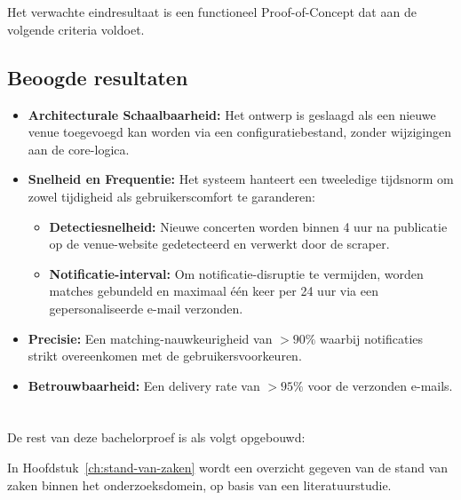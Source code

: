 \section{}%
\label{sec:onderzoeksdoelstelling}

Het verwachte eindresultaat is een functioneel Proof-of-Concept dat aan de volgende criteria voldoet.

\subsection{Beoogde resultaten}
\begin{itemize}
    \item \textbf{Architecturale Schaalbaarheid:} Het ontwerp is geslaagd als een nieuwe venue toegevoegd kan worden via een configuratiebestand, zonder wijzigingen aan de core-logica.
    \item \textbf{Snelheid en Frequentie:} Het systeem hanteert een tweeledige tijdsnorm om zowel tijdigheid als gebruikerscomfort te garanderen:
    \begin{itemize}
        \item \textbf{Detectiesnelheid:} Nieuwe concerten worden binnen 4 uur na publicatie op de venue-website gedetecteerd en verwerkt door de scraper.
        \item \textbf{Notificatie-interval:} Om notificatie-disruptie te vermijden, worden matches gebundeld en maximaal één keer per 24 uur via een gepersonaliseerde e-mail verzonden.
    \end{itemize}
    \item \textbf{Precisie:} Een matching-nauwkeurigheid van $>90\%$ waarbij notificaties strikt overeenkomen met de gebruikersvoorkeuren.
    \item \textbf{Betrouwbaarheid:} Een delivery rate van $>95\%$ voor de verzonden e-mails.
\end{itemize}

\section{}%
\label{sec:opzet-bachelorproef}

De rest van deze bachelorproef is als volgt opgebouwd:

In Hoofdstuk~\ref{ch:stand-van-zaken} wordt een overzicht gegeven van de stand van zaken binnen het onderzoeksdomein, op basis van een literatuurstudie.

